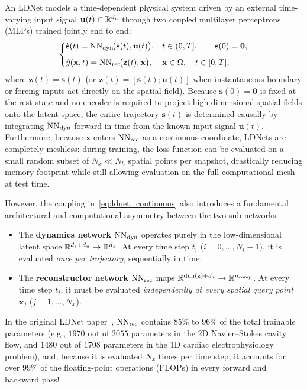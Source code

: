 An LDNet models a time-dependent physical system driven by an external time-varying input signal $\mathbf{u}(t)\in\mathbb{R}^{d_u}$ through two coupled multilayer perceptrons (MLPs) trained jointly end to end:
\begin{equation}
  \begin{dcases}
    \dot{\mathbf{s}}(t) = \mathrm{NN}_{\mathrm{dyn}}\!\big(\mathbf{s}(t), \mathbf{u}(t)\big), & t \in (0, T], \qquad \mathbf{s}(0) = \mathbf{0}, \\[0.4em]
    \hat{y}(\mathbf{x},t) = \mathrm{NN}_{\mathrm{rec}}\!\big(\mathbf{z}(t), \mathbf{x}\big), & \mathbf{x} \in \Omega, \quad t \in [0, T],
  \end{dcases}
  \label{eq:ldnet_continuous}
\end{equation}
where $\mathbf{z}(t) = \mathbf{s}(t)$ (or $\mathbf{z}(t) = [\mathbf{s}(t); \mathbf{u}(t)]$ when instantaneous boundary or forcing inputs act directly on the spatial field). Because $\mathbf{s}(0)=\mathbf{0}$ is fixed at the rest state and no encoder is required to project high-dimensional spatial fields onto the latent space, the entire trajectory $\mathbf{s}(t)$ is determined causally by integrating $\mathrm{NN}_{\mathrm{dyn}}$ forward in time from the known input signal $\mathbf{u}(t)$. Furthermore, because $\mathbf{x}$ enters $\mathrm{NN}_{\mathrm{rec}}$ as a continuous coordinate, LDNets are completely meshless: during training, the loss function can be evaluated on a small random subset of $N_x \ll N_h$ spatial points per snapshot, drastically reducing memory footprint while still allowing evaluation on the full computational mesh at test time.

However, the coupling in~\eqref{eq:ldnet_continuous} also introduces a fundamental architectural and computational asymmetry between the two sub-networks:
\begin{itemize}[leftmargin=2em]
  \item The \textbf{dynamics network} $\mathrm{NN}_{\mathrm{dyn}}$ operates purely in the low-dimensional latent space $\mathbb{R}^{d_s + d_u} \to \mathbb{R}^{d_s}$. At every time step $t_i$ ($i=0,\dots,N_t-1$), it is evaluated \emph{once per trajectory}, sequentially in time.
  \item The \textbf{reconstructor network} $\mathrm{NN}_{\mathrm{rec}}$ maps $\mathbb{R}^{\dim(\mathbf{z}) + d_x} \to \mathbb{R}^{n_{\mathrm{comp}}}$. At every time step $t_i$, it must be evaluated \emph{independently at every spatial query point} $\mathbf{x}_j$ ($j=1,\dots,N_x$).
\end{itemize}
In the original LDNet paper~\cite{regazzoni2024learning}, $\mathrm{NN}_{\mathrm{rec}}$ contains $85\%$ to $96\%$ of the total trainable parameters (e.g., $1970$ out of $2055$ parameters in the 2D Navier--Stokes cavity flow, and $1480$ out of $1708$ parameters in the 1D cardiac electrophysiology problem), and, because it is evaluated $N_x$ times per time step, it accounts for over $99\%$ of the floating-point operations (FLOPs) in every forward and backward pass!

